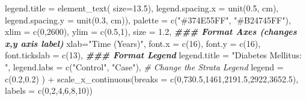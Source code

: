 \documentclass[
]{book}
\newenvironment{Shaded}{\begin{snugshade}}{\end{snugshade}}
\newcommand{\AttributeTok}[1]{\textcolor[rgb]{0.77,0.63,0.00}{#1}}
\newcommand{\CommentTok}[1]{\textcolor[rgb]{0.56,0.35,0.01}{\textit{#1}}}
\newcommand{\DecValTok}[1]{\textcolor[rgb]{0.00,0.00,0.81}{#1}}
\newcommand{\DocumentationTok}[1]{\textcolor[rgb]{0.56,0.35,0.01}{\textbf{\textit{#1}}}}
\newcommand{\FloatTok}[1]{\textcolor[rgb]{0.00,0.00,0.81}{#1}}
\newcommand{\FunctionTok}[1]{\textcolor[rgb]{0.00,0.00,0.00}{#1}}
\newcommand{\NormalTok}[1]{#1}
\newcommand{\SpecialCharTok}[1]{\textcolor[rgb]{0.00,0.00,0.00}{#1}}
\newcommand{\StringTok}[1]{\textcolor[rgb]{0.31,0.60,0.02}{#1}}
\begin{document}
\begin{Shaded}
\begin{Highlighting}[]
                                             \AttributeTok{legend.title =} \FunctionTok{element\_text}\NormalTok{( }\AttributeTok{size=}\FloatTok{13.5}\NormalTok{),}
                                             \AttributeTok{legend.spacing.x =} \FunctionTok{unit}\NormalTok{(}\FloatTok{0.5}\NormalTok{, }\StringTok{\textquotesingle{}cm\textquotesingle{}}\NormalTok{),}
                                             \AttributeTok{legend.spacing.y =} \FunctionTok{unit}\NormalTok{(}\FloatTok{0.3}\NormalTok{, }\StringTok{\textquotesingle{}cm\textquotesingle{}}\NormalTok{)),}
                             \AttributeTok{palette =} \FunctionTok{c}\NormalTok{(}\StringTok{"\#374E55FF"}\NormalTok{, }\StringTok{"\#B24745FF"}\NormalTok{),}
                             \AttributeTok{xlim =} \FunctionTok{c}\NormalTok{(}\DecValTok{0}\NormalTok{,}\DecValTok{2600}\NormalTok{),}
                             \AttributeTok{ylim =} \FunctionTok{c}\NormalTok{(}\FloatTok{0.5}\NormalTok{,}\DecValTok{1}\NormalTok{), }
                             \AttributeTok{size =} \FloatTok{1.2}\NormalTok{,}
                             \DocumentationTok{\#\#\# Format Axes (changes x,y axis label)}
                             \AttributeTok{xlab=}\StringTok{"Time (Years)"}\NormalTok{, }
                             \AttributeTok{font.x =} \FunctionTok{c}\NormalTok{(}\DecValTok{16}\NormalTok{), }
                             \AttributeTok{font.y =} \FunctionTok{c}\NormalTok{(}\DecValTok{16}\NormalTok{),}
                             \AttributeTok{font.tickslab =} \FunctionTok{c}\NormalTok{(}\DecValTok{13}\NormalTok{),}
                             \DocumentationTok{\#\#\# Format Legend}
                             \AttributeTok{legend.title =} \StringTok{"Diabetes Mellitus:  "}\NormalTok{,}
                             \AttributeTok{legend.labs =} \FunctionTok{c}\NormalTok{(}\StringTok{"Control"}\NormalTok{, }\StringTok{"Case"}\NormalTok{), }\CommentTok{\# Change the Strata Legend}
                             \AttributeTok{legend =} \FunctionTok{c}\NormalTok{(}\FloatTok{0.2}\NormalTok{,}\FloatTok{0.2}\NormalTok{) }
\NormalTok{                             ) }\SpecialCharTok{+} \FunctionTok{scale\_x\_continuous}\NormalTok{(}\AttributeTok{breaks =} \FunctionTok{c}\NormalTok{(}\DecValTok{0}\NormalTok{,}\FloatTok{730.5}\NormalTok{,}\DecValTok{1461}\NormalTok{,}\FloatTok{2191.5}\NormalTok{,}\DecValTok{2922}\NormalTok{,}\FloatTok{3652.5}\NormalTok{), }\AttributeTok{labels =} \FunctionTok{c}\NormalTok{(}\DecValTok{0}\NormalTok{,}\DecValTok{2}\NormalTok{,}\DecValTok{4}\NormalTok{,}\DecValTok{6}\NormalTok{,}\DecValTok{8}\NormalTok{,}\DecValTok{10}\NormalTok{))}
\end{Highlighting}
\end{Shaded}
\end{document}
